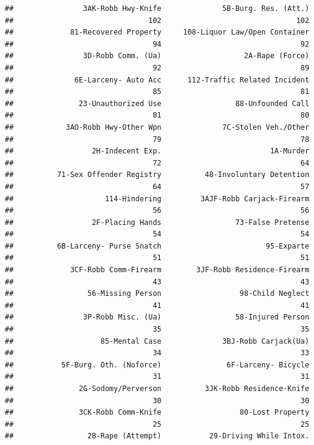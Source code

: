 \documentclass[12pt,]{book}
\theoremstyle{definition}
\theoremstyle{definition}
\theoremstyle{definition}
\theoremstyle{remark}
\begin{document}
\begin{verbatim}
##                3AK-Robb Hwy-Knife              5B-Burg. Res. (Att.) 
##                               102                               102 
##             81-Recovered Property     108-Liquor Law/Open Container 
##                                94                                92 
##                3D-Robb Comm. (Ua)                   2A-Rape (Force) 
##                                92                                89 
##              6E-Larceny- Auto Acc      112-Traffic Related Incident 
##                                85                                81 
##               23-Unauthorized Use                 88-Unfounded Call 
##                                81                                80 
##            3AO-Robb Hwy-Other Wpn              7C-Stolen Veh./Other 
##                                79                                78 
##                  2H-Indecent Exp.                         1A-Murder 
##                                72                                64 
##          71-Sex Offender Registry          48-Involuntary Detention 
##                                64                                57 
##                     114-Hindering         3AJF-Robb Carjack-Firearm 
##                                56                                56 
##                  2F-Placing Hands                 73-False Pretense 
##                                54                                54 
##          6B-Larceny- Purse Snatch                        95-Exparte 
##                                51                                51 
##             3CF-Robb Comm-Firearm        3JF-Robb Residence-Firearm 
##                                43                                43 
##                 56-Missing Person                  98-Child Neglect 
##                                41                                41 
##                3P-Robb Misc. (Ua)                 58-Injured Person 
##                                35                                35 
##                    85-Mental Case              3BJ-Robb Carjack(Ua) 
##                                34                                33 
##           5F-Burg. Oth. (Noforce)               6F-Larceny- Bicycle 
##                                31                                31 
##               2G-Sodomy/Perverson          3JK-Robb Residence-Knife 
##                                30                                30 
##               3CK-Robb Comm-Knife                  80-Lost Property 
##                                25                                25 
##                 2B-Rape (Attempt)           29-Driving While Intox. 

\end{verbatim}
\end{document}
